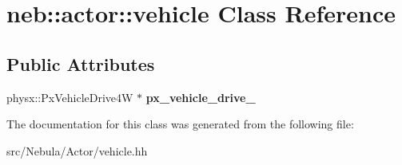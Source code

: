 \hypertarget{classneb_1_1actor_1_1vehicle}{\section{neb\-:\-:actor\-:\-:vehicle \-Class \-Reference}
\label{classneb_1_1actor_1_1vehicle}
}
\subsection*{\-Public \-Attributes}
\begin{DoxyCompactItemize}
\item 
\hypertarget{classneb_1_1actor_1_1vehicle_ae954f4c54a3a05c8d99ead4a2c6391f1}{physx\-::\-Px\-Vehicle\-Drive4\-W $\ast$ {\bfseries px\-\_\-vehicle\-\_\-drive\-\_\-}}\label{classneb_1_1actor_1_1vehicle_ae954f4c54a3a05c8d99ead4a2c6391f1}

\end{DoxyCompactItemize}


\-The documentation for this class was generated from the following file\-:\begin{DoxyCompactItemize}
\item 
src/\-Nebula/\-Actor/vehicle.\-hh\end{DoxyCompactItemize}
